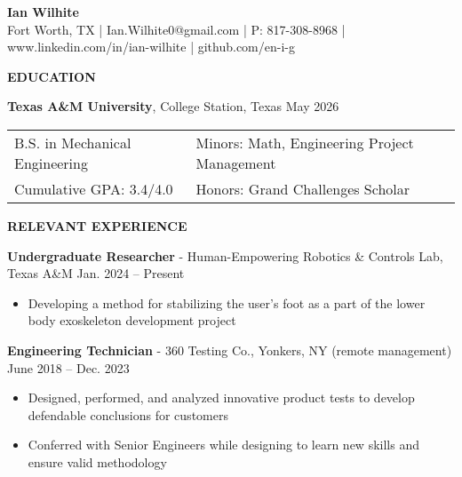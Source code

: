 \documentclass[18pt]{article}
\begin{document}
\begin{center}
    \textbf{Ian Wilhite}\\ 
    {Fort Worth, TX | Ian.Wilhite0@gmail.com | P: 817-308-8968 | www.linkedin.com/in/ian-wilhite | github.com/en-i-g}\\
    
\end{center}

\begin{center}
    \textbf{EDUCATION}
    \hrulefill
\end{center}

\textbf{Texas A\&M University}, College Station, Texas \hfill May 2026

\begin{tabular}{l|l} %
    B.S. in Mechanical Engineering \hspace*{0.75in} & Minors: Math, Engineering Project Management \\ 
    Cumulative GPA: 3.4/4.0 & Honors: Grand Challenges Scholar\\
\end{tabular}


\begin{center}
    \textbf{RELEVANT EXPERIENCE}
    \hrulefill
\end{center}

\textbf{Undergraduate Researcher}  - Human-Empowering Robotics \& Controls Lab, Texas A\&M \hfill Jan. 2024 – Present

\begin{itemize}[noitemsep]
    \vspace{-\baselineskip}
    \item Developing a method for stabilizing the user’s foot as a part of the lower body exoskeleton development project
\end{itemize}

\textbf{Engineering Technician} - 360 Testing Co., Yonkers, NY (remote management) \hfill June 2018 – Dec. 2023

\begin{itemize}[noitemsep]
    \vspace{-\baselineskip}
    \item Designed, performed, and analyzed innovative product tests to develop defendable conclusions for customers
    \item Conferred with Senior Engineers while designing to learn new skills and ensure valid methodology
\end{itemize}
\end{document}

